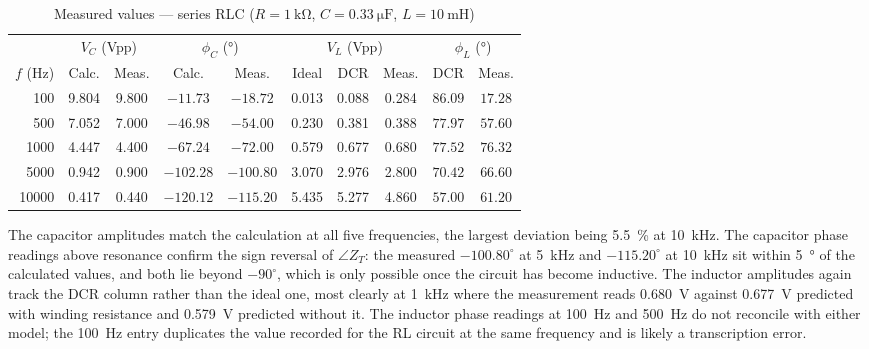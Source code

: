 \documentclass[11pt]{article}
\begin{document}
\begin{table}[H]
    \centering
    \caption{Measured values --- series RLC ($R = \SI{1}{\kilo\ohm}$, $C = \SI{0.33}{\micro\farad}$, $L = \SI{10}{\milli\henry}$)}
    \small
    \begin{tabular}{rccccccccc}
        \toprule
        & \multicolumn{2}{c}{$V_C$ (Vpp)} & \multicolumn{2}{c}{$\phi_C$ (\si{\degree})}
        & \multicolumn{3}{c}{$V_L$ (Vpp)} & \multicolumn{2}{c}{$\phi_L$ (\si{\degree})} \\
        \cmidrule(lr){2-3} \cmidrule(lr){4-5} \cmidrule(lr){6-8} \cmidrule(lr){9-10}
        $f$ (Hz) & Calc. & Meas. & Calc. & Meas. & Ideal & DCR & Meas. & DCR & Meas. \\
        \midrule
        100   & 9.804 & 9.800 & $-11.73$  & $-18.72$  & 0.013 & 0.088 & 0.284 & $86.09$ & $17.28$ \\
        500   & 7.052 & 7.000 & $-46.98$  & $-54.00$  & 0.230 & 0.381 & 0.388 & $77.97$ & $57.60$ \\
        1000  & 4.447 & 4.400 & $-67.24$  & $-72.00$  & 0.579 & 0.677 & 0.680 & $77.52$ & $76.32$ \\
        5000  & 0.942 & 0.900 & $-102.28$ & $-100.80$ & 3.070 & 2.976 & 2.800 & $70.42$ & $66.60$ \\
        10000 & 0.417 & 0.440 & $-120.12$ & $-115.20$ & 5.435 & 5.277 & 4.860 & $57.00$ & $61.20$ \\
        \bottomrule
    \end{tabular}
\end{table}

The capacitor amplitudes match the calculation at all five frequencies, the
largest deviation being \SI{5.5}{\percent} at \SI{10}{\kilo\hertz}. The capacitor
phase readings above resonance confirm the sign reversal of $\angle Z_T$: the
measured $-100.80^\circ$ at \SI{5}{\kilo\hertz} and $-115.20^\circ$ at
\SI{10}{\kilo\hertz} sit within \SI{5}{\degree} of the calculated values, and both
lie beyond $-90^\circ$, which is only possible once the circuit has become
inductive. The inductor amplitudes again track the DCR column rather than the
ideal one, most clearly at \SI{1}{\kilo\hertz} where the measurement reads
\SI{0.680}{\volt} against \SI{0.677}{\volt} predicted with winding resistance and
\SI{0.579}{\volt} predicted without it. The inductor phase readings at
\SI{100}{\hertz} and \SI{500}{\hertz} do not reconcile with either model; the
\SI{100}{\hertz} entry duplicates the value recorded for the RL circuit at the
same frequency and is likely a transcription error.
\end{document}
